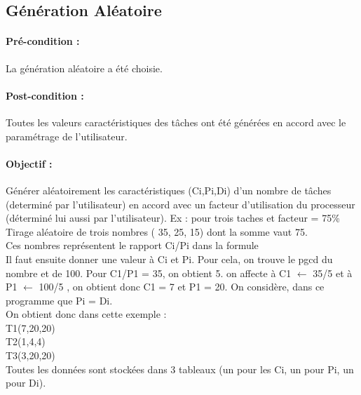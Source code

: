 	\newpage
	\subsection{Génération Aléatoire}
		\paragraph{Pré-condition :} La génération aléatoire a été choisie.
		\paragraph{Post-condition :} Toutes les valeurs caractéristiques des tâches ont été générées en accord avec le paramétrage de l’utilisateur.


		\paragraph{Objectif :} Générer aléatoirement les caractéristiques (Ci,Pi,Di) d’un nombre de tâches (determiné par l’utilisateur) en accord avec un facteur d’utilisation du processeur (déterminé lui aussi par l’utilisateur).
		Ex : pour trois taches et facteur = 75\% \\ 


		    Tirage aléatoire de trois nombres ( 35, 25, 15) dont la somme vaut 75. \\
		    Ces nombres représentent le rapport Ci/Pi dans la formule  \\
		    Il faut ensuite donner une valeur à Ci et Pi. Pour cela, on trouve le pgcd du nombre et de 100. Pour C1/P1 = 35, on obtient 5.  on affecte à C1 $\leftarrow$ 35/5 et à P1 $\leftarrow$ 100/5 , on obtient donc C1 = 7 et P1 = 20. On considère, dans ce programme que Pi = Di. \\
		    
		    On obtient donc dans cette exemple :  \\
		    T1(7,20,20) \\
		    T2(1,4,4) \\
		    T3(3,20,20) \\

		    Toutes les données sont stockées dans 3 tableaux (un pour les Ci, un pour Pi, un pour Di). 

